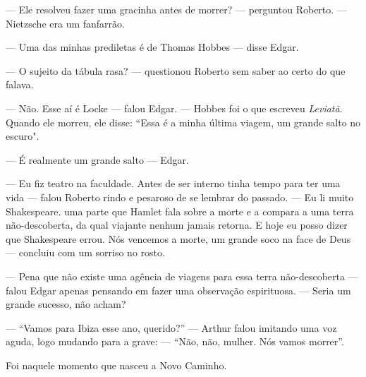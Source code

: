 --- Ele resolveu fazer uma gracinha antes de morrer? --- perguntou Roberto. --- Nietzsche era um fanfarrão.

--- Uma das minhas prediletas é de Thomas Hobbes --- disse Edgar.

--- O sujeito da tábula rasa? --- questionou Roberto sem saber ao certo do que falava.

--- Não. Esse aí é Locke --- falou Edgar. --- Hobbes foi o que escreveu \emph{Leviatã}. Quando ele morreu, ele disse: ``Essa é a minha última viagem, um grande salto no escuro".

--- É realmente um grande salto ---  Edgar.

--- Eu fiz teatro na faculdade. Antes de ser interno tinha tempo para ter uma vida --- falou Roberto rindo e pesaroso de se lembrar do passado. --- Eu li muito Shakespeare.  uma parte que Hamlet fala sobre a morte e a compara a uma terra não-descoberta, da qual viajante nenhum jamais retorna. E hoje eu posso dizer que Shakespeare errou. Nós vencemos a morte, um grande soco na face de Deus --- concluiu com um sorriso no rosto.

--- Pena que não existe uma agência de viagens para essa terra não-descoberta --- falou Edgar apenas pensando em fazer uma observação espirituosa. --- Seria um grande sucesso, não acham?

--- ``Vamos para Ibiza esse ano, querido?'' --- Arthur falou imitando uma voz aguda, logo mudando para a grave: --- ``Não, não, mulher. Nós vamos morrer''.

Foi naquele momento que nasceu a Novo Caminho.
